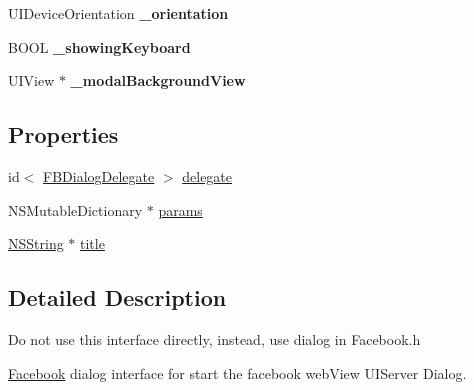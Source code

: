 \begin{DoxyCompactItemize}
\item 
\hypertarget{interface_f_b_dialog_a0f34e43632d6f23dfe6c0aa0a91c88cf}{
\-U\-I\-Device\-Orientation {\bfseries \-\_\-orientation}}
\label{interface_f_b_dialog_a0f34e43632d6f23dfe6c0aa0a91c88cf}

\item 
\hypertarget{interface_f_b_dialog_a77c9eddfdf58634226bb0946b5eea792}{
\-B\-O\-O\-L {\bfseries \-\_\-showing\-Keyboard}}
\label{interface_f_b_dialog_a77c9eddfdf58634226bb0946b5eea792}

\item 
\hypertarget{interface_f_b_dialog_aea094676a42ceb2c96c30211634c9a66}{
\-U\-I\-View $\ast$ {\bfseries \-\_\-modal\-Background\-View}}
\label{interface_f_b_dialog_aea094676a42ceb2c96c30211634c9a66}

\end{DoxyCompactItemize}
\subsection*{\-Properties}
\begin{DoxyCompactItemize}
\item 
id$<$ \hyperlink{protocol_f_b_dialog_delegate-p}{\-F\-B\-Dialog\-Delegate} $>$ \hyperlink{interface_f_b_dialog_a158079f95fccddae603fd2c01a230e38}{delegate}
\item 
\-N\-S\-Mutable\-Dictionary $\ast$ \hyperlink{interface_f_b_dialog_a19b9b51024f653d44d8ac39b0f343046}{params}
\item 
\hyperlink{class_n_s_string}{\-N\-S\-String} $\ast$ \hyperlink{interface_f_b_dialog_a5c82d4089f7f4171063deff8ced7e34c}{title}
\end{DoxyCompactItemize}


\subsection{\-Detailed \-Description}
\-Do not use this interface directly, instead, use dialog in \-Facebook.\-h

\hyperlink{interface_facebook}{\-Facebook} dialog interface for start the facebook web\-View \-U\-I\-Server \-Dialog. 

